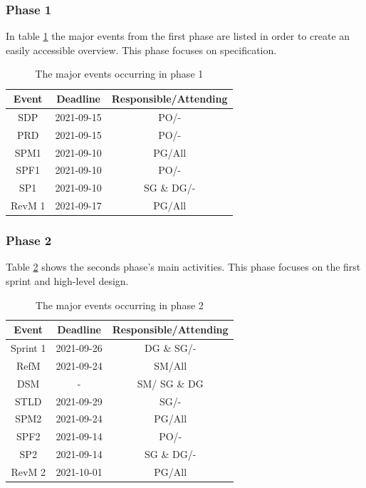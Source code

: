 \documentclass{article}
\begin{document}
\subsubsection{Phase 1}
In table \ref{tab:phase1} the major events from the first phase are listed in order to create an easily accessible overview. This phase focuses on specification.
\begin{table}[H]
    \centering
    \begin{tabular}{|c|c|c|}
    \hline
        Event & Deadline & Responsible/Attending \\
        \hline \hline
        SDP & 2021-09-15 & PO/- \\
        \hline
        PRD & 2021-09-15 & PO/- \\
        \hline
        SPM1 & 2021-09-10 & PG/All \\
        \hline
        SPF1 & 2021-09-10 & PO/- \\
        \hline
        SP1 & 2021-09-10 & SG \& DG/- \\
        \hline
        RevM 1 & 2021-09-17 & PG/All \\
        \hline
    \end{tabular}
    \caption{The major events occurring in phase 1}
    \label{tab:phase1}
\end{table}

\subsubsection{Phase 2}
Table \ref{tab:phase2} shows the seconds phase's main activities. This phase focuses on the first sprint and high-level design.
\begin{table}[H]
    \centering
    \begin{tabular}{|c|c|c|}
    \hline
        Event & Deadline & Responsible/Attending \\
        \hline \hline
        Sprint 1 & 2021-09-26 & DG \& SG/- \\
        \hline
        RefM & 2021-09-24 & SM/All \\
        \hline
        DSM & - & SM/ SG \& DG \\
        \hline
        STLD & 2021-09-29 & SG/- \\
        \hline
        SPM2 & 2021-09-24 & PG/All \\
        \hline
        SPF2 & 2021-09-14 & PO/- \\
        \hline
        SP2 & 2021-09-14 & SG \& DG/- \\
        \hline
        RevM 2 & 2021-10-01 & PG/All \\
        \hline
    \end{tabular}
    \caption{The major events occurring in phase 2}
    \label{tab:phase2}
\end{table}
\end{document}
